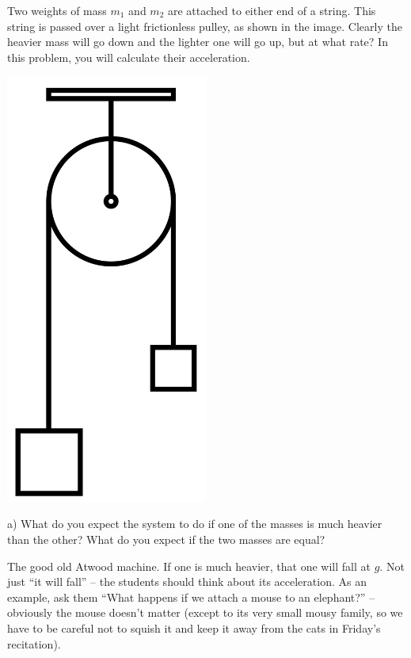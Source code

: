 \documentclass[12pt]{article}
\begin{document}
		\begin{minipage}{0.7\textwidth}
			Two weights of mass $m_1$ and $m_2$ are attached to either end of a string. This string is passed over a light frictionless pulley, as shown in the image.
			Clearly the heavier mass will go down and the lighter one will go up, but at what rate? In this problem, you will calculate their acceleration.
		\end{minipage} \hfill
		\begin{minipage}{0.3\textwidth}
			\begin{center}\includegraphics[width=0.5\textwidth]{atwood.png}
			\end{center}
		\end{minipage} \hfill
		
		a) What do you expect the system to do if one of the masses is much heavier than the other? What do you expect if the
		two masses are equal?

{\color{Red}
The good old Atwood machine. If one is much heavier, that one will fall at $g$. Not just ``it will fall'' -- the students should think about its acceleration. As an example, ask them ``What happens if we attach a mouse to an elephant?'' -- obviously the mouse doesn't matter (except to its very small mousy family, so we have to be careful not to squish it and keep it away from the cats in Friday's recitation).
}
		
\end{document}
